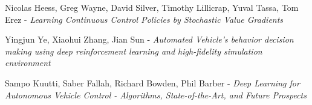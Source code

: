 \begin{thebibliography}{9}
Nicolas Heess, Greg Wayne, David Silver, Timothy Lillicrap, Yuval Tassa, Tom Erez - \textsl{Learning Continuous Control Policies by Stochastic Value Gradients}

Yingjun Ye, Xiaohui Zhang, Jian Sun - \textsl{Automated Vehicle's behavior decision making using deep reinforcement learning and high-fidelity simulation environment}

Sampo Kuutti, Saber Fallah, Richard Bowden, Phil Barber - \textsl{Deep Learning for Autonomous Vehicle Control - Algorithms, State-of-the-Art, and Future Prospects}

\end{thebibliography}
